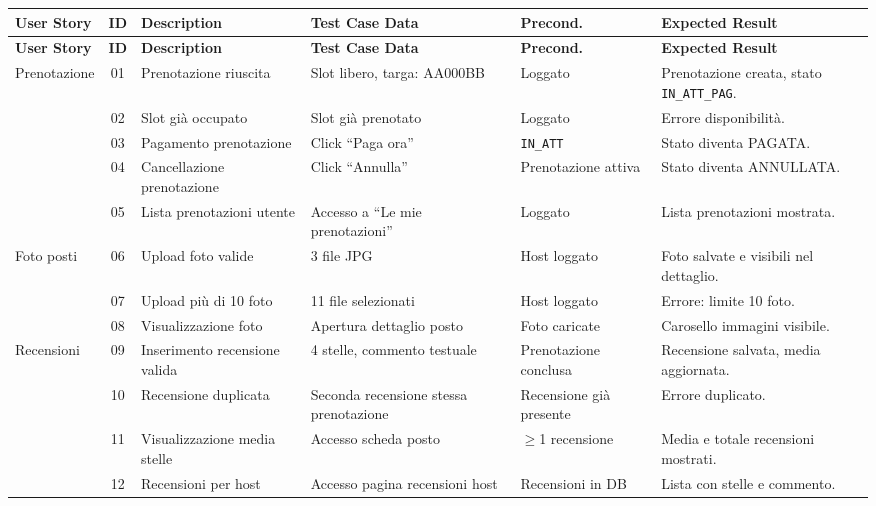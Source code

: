 \documentclass[a4paper,12pt]{article}
\begin{document}
\begin{longtable}{|l|c|p{2.8cm}|p{2.5cm}|p{1.8cm}|p{2.8cm}|}
\hline
\textbf{User Story} & \textbf{ID} & \textbf{Description} & \textbf{Test Case Data} & \textbf{Precond.} & \textbf{Expected Result} \\
\hline
\endfirsthead
\hline
\textbf{User Story} & \textbf{ID} & \textbf{Description} & \textbf{Test Case Data} & \textbf{Precond.} & \textbf{Expected Result} \\
\hline
\endhead
\multirow{5}{*}{Prenotazione}
 & 01 & Prenotazione riuscita        & Slot libero, targa: AA000BB    & Loggato          & Prenotazione creata, stato \texttt{\small IN\_ATT\_PAG}. \\
\cline{2-6}
 & 02 & Slot già occupato            & Slot già prenotato             & Loggato          & Errore disponibilità. \\
\cline{2-6}
 & 03 & Pagamento prenotazione       & Click ``Paga ora''             & \texttt{\small IN\_ATT}  & Stato diventa PAGATA. \\
\cline{2-6}
 & 04 & Cancellazione prenotazione   & Click ``Annulla''              & Prenotazione attiva & Stato diventa ANNULLATA. \\
\cline{2-6}
 & 05 & Lista prenotazioni utente    & Accesso a ``Le mie prenotazioni'' & Loggato       & Lista prenotazioni mostrata. \\
\hline
\multirow{3}{*}{Foto posti}
 & 06 & Upload foto valide           & 3 file JPG                     & Host loggato     & Foto salvate e visibili nel dettaglio. \\
\cline{2-6}
 & 07 & Upload più di 10 foto        & 11 file selezionati            & Host loggato     & Errore: limite 10 foto. \\
\cline{2-6}
 & 08 & Visualizzazione foto         & Apertura dettaglio posto       & Foto caricate    & Carosello immagini visibile. \\
\hline
\multirow{4}{*}{Recensioni}
 & 09 & Inserimento recensione valida & 4 stelle, commento testuale   & Prenotazione conclusa & Recensione salvata, media aggiornata. \\
\cline{2-6}
 & 10 & Recensione duplicata         & Seconda recensione stessa prenotazione & Recensione già presente & Errore duplicato. \\
\cline{2-6}
 & 11 & Visualizzazione media stelle & Accesso scheda posto           & $\geq$1 recensione & Media e totale recensioni mostrati. \\
\cline{2-6}
 & 12 & Recensioni per host          & Accesso pagina recensioni host & Recensioni in DB & Lista con stelle e commento. \\

\end{longtable}
\end{document}
